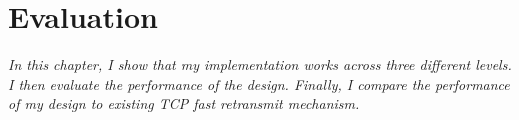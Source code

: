 \chapter{Evaluation}
\textit{In this chapter, I show that my implementation works across three different levels. I then evaluate the performance of the design. Finally, I compare the performance of my design to existing TCP fast retransmit mechanism. 
}

